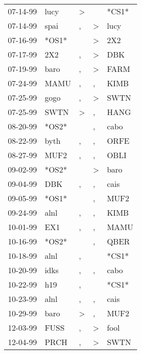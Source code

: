 \begin{supertabular}{lllll}
 07-14-99 &   lucy &     \textgreater &                  &  *CS1* \\
 07-14-99 &   spai &                , &     \textgreater &   lucy \\
 07-16-99 &  *OS1* &                  &     \textgreater &    2X2 \\
 07-17-99 &    2X2 &                , &     \textgreater &    DBK \\
 07-19-99 &   baro &                , &     \textgreater &   FARM \\
 07-24-99 &   MAMU &                , &                , &   KIMB \\
 07-25-99 &   gogo &                , &     \textgreater &   SWTN \\
 07-25-99 &   SWTN &     \textgreater &                , &   HANG \\
 08-20-99 &  *OS2* &                  &                , &   cabo \\
 08-22-99 &   byth &                , &                , &   ORFE \\
 08-27-99 &   MUF2 &                , &                , &   OBLI \\
 09-02-99 &  *OS2* &                  &     \textgreater &   baro \\
 09-04-99 &    DBK &                , &                , &   cais \\
 09-05-99 &  *OS1* &                  &                , &   MUF2 \\
 09-24-99 &   alnl &                , &                , &   KIMB \\
 10-01-99 &    EX1 &                , &                , &   MAMU \\
 10-16-99 &  *OS2* &                  &                , &   QBER \\
 10-18-99 &   alnl &                , &                  &  *CS1* \\
 10-20-99 &   idks &                , &                , &   cabo \\
 10-22-99 &    h19 &                , &                  &  *CS1* \\
 10-23-99 &   alnl &                , &                , &   cais \\
 10-29-99 &   baro &     \textgreater &                , &   MUF2 \\
 12-03-99 &   FUSS &                , &     \textgreater &   fool \\
 12-04-99 &   PRCH &                , &     \textgreater &   SWTN \\

\end{supertabular}
